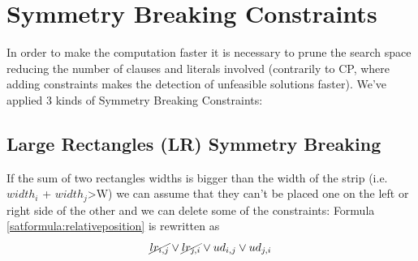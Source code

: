 \newpage

\section{Symmetry Breaking Constraints}
    In order to make the computation faster it is necessary to prune the search space reducing the number of clauses and literals involved (contrarily to CP, where adding constraints makes the detection of unfeasible solutions faster).
    \newline
    We've applied 3 kinds of Symmetry Breaking Constraints:
\subsection{Large Rectangles (LR) Symmetry Breaking}
    If the sum of two rectangles widths is bigger than the width of the strip (i.e. ${width}_i$ + ${width}_j$>W) we can assume that they can't be placed one on the left or right side of the other and we can delete some of the constraints:
    \newline
    Formula \ref{satformula:relativeposition} is rewritten as 
    \begin{equation*}
         \cancel{lr_{i,j}} \vee \cancel{lr_{j,i}} \vee ud_{i,j} \vee ud_{j,i}
    \end{equation*}

